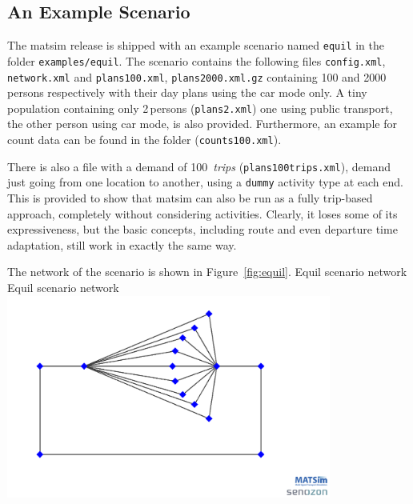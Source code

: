 \subsection{An Example Scenario}
The \gls{matsim} release is shipped with an example scenario named \lstinline|equil| in the folder \lstinline|examples/equil|. The scenario contains the following files \lstinline|config.xml|, \lstinline|network.xml| and \lstinline|plans100.xml|, \lstinline|plans2000.xml.gz| containing 100 and 2000\,persons respectively with their day plans using the car mode only. A tiny population containing only 2\,persons (\lstinline|plans2.xml|) one using public transport, the other person using car mode, is also provided. Furthermore, an example for count data can be found in the folder (\lstinline|counts100.xml|). 



There is also a file with a demand of 
100~\emph{trips} (\lstinline|plans100trips.xml|), \ie demand just going from one location to another, using a \lstinline$dummy$ activity type at each end.  This is provided to show that \gls{matsim} can also be run as a fully trip-based approach, \ie completely without considering activities. Clearly, it loses some of its expressiveness, but the basic concepts, including route and even departure time adaptation, still work in exactly the same way.

The network of the scenario is shown in Figure~\ref{fig:equil}.
%
\createfigure%
{Equil scenario network}%
{Equil scenario network}%
{\label{fig:equil}}%
{\includegraphics[width=0.8\textwidth, angle=0]{using/figures/equil.png}}%
{}

